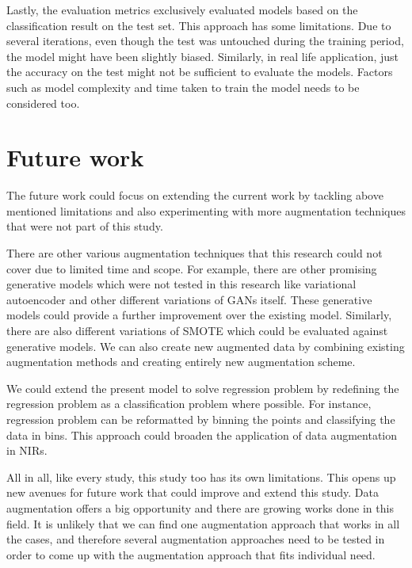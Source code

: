 Lastly, the evaluation metrics exclusively evaluated models based on the classification result on the test set. This approach has some limitations. Due to several iterations, even though the test was untouched during the training period, the model might have been slightly biased. Similarly, in real life application, just the accuracy on the test might not be sufficient to evaluate the models. Factors such as model complexity and time taken to train the model needs to be considered too.


\section{Future work}

The future work could focus on extending the current work by tackling above mentioned limitations and also experimenting with more augmentation techniques that were not part of this study. 

There are other various augmentation techniques that this research could not cover due to limited time and scope. For example, there are other promising generative models which were not tested in this research like variational autoencoder and other different variations of GANs itself. These generative models could provide a further improvement over the existing model. Similarly, there are also different variations of SMOTE which could be evaluated against generative models. We can also create new augmented data by combining existing augmentation methods and creating entirely new augmentation scheme.

We could extend the present model to solve regression problem by redefining the regression problem as a classification problem where possible. For instance, regression problem can be reformatted by binning the points and classifying the data in bins. This approach could broaden the application of data augmentation in NIRs. 


All in all, like every study, this study too has its own limitations. This opens up new avenues for future work that could improve and extend this study. Data augmentation offers a big opportunity and there are growing works done in this field. It is unlikely that we can find one augmentation approach that works in all the cases, and therefore several augmentation approaches need to be tested in order to come up with the augmentation approach that fits individual need. 











 

